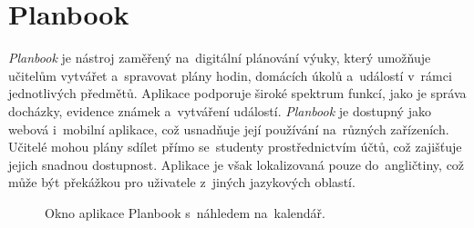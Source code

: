 \documentclass[male,czech,api_bc]{kitheses}
\begin{document}
\section{Planbook}

\textit{Planbook} je nástroj zaměřený na~digitální plánování výuky, který umožňuje učitelům vytvářet a~spravovat plány hodin, domácích úkolů a~událostí v~rámci jednotlivých předmětů. Aplikace podporuje široké spektrum funkcí, jako je správa docházky, evidence známek a~vytváření událostí. \textit{Planbook} je dostupný jako webová i~mobilní aplikace, což usnadňuje její používání na~různých zařízeních. Učitelé mohou plány sdílet přímo se~studenty prostřednictvím účtů, což zajišťuje jejich snadnou dostupnost. Aplikace je však lokalizovaná pouze do~angličtiny, což může být překážkou pro uživatele z~jiných jazykových oblastí.

\begin{figure}[H]
	\centering
	\caption{Okno aplikace Planbook s~náhledem na~kalendář.}
	\label{fig:planbook-1}
\end{figure}
\end{document}
